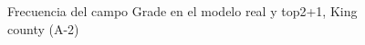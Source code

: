 \begin{figure}[H]
    \centering
    
    \caption{Frecuencia del campo Grade en el modelo real y top2+1, King county (A-2)}
    \label{frecuency-top2+1-grade}
\end{figure}